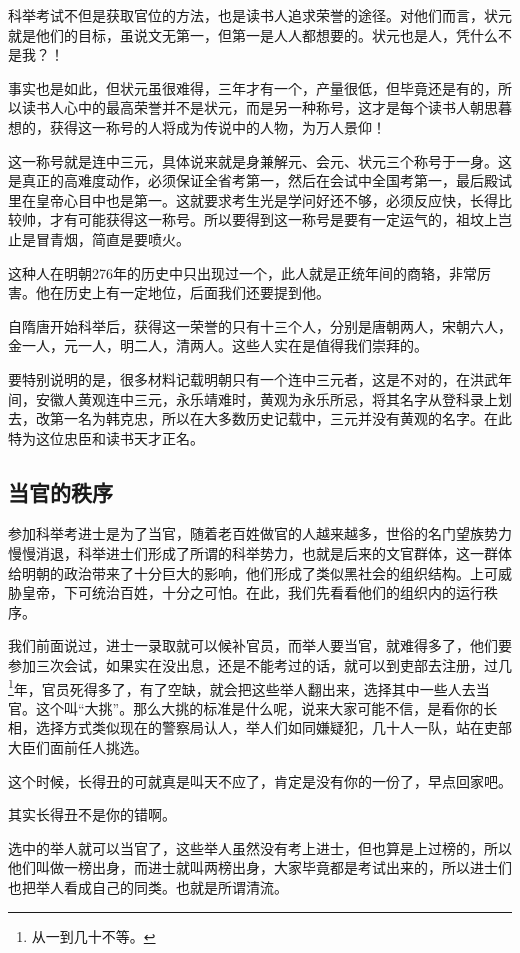 \begin{multicols}{\theparacolNo}
		科举考试不但是获取官位的方法，也是读书人追求荣誉的途径。对他们而言，状元就是他们的目标，虽说文无第一，但第一是人人都想要的。状元也是人，凭什么不是我？！

		事实也是如此，但状元虽很难得，三年才有一个，产量很低，但毕竟还是有的，所以读书人心中的最高荣誉并不是状元，而是另一种称号，这才是每个读书人朝思暮想的，获得这一称号的人将成为传说中的人物，为万人景仰！

		这一称号就是连中三元，具体说来就是身兼解元、会元、状元三个称号于一身。这是真正的高难度动作，必须保证全省考第一，然后在会试中全国考第一，最后殿试里在皇帝心目中也是第一。这就要求考生光是学问好还不够，必须反应快，长得比较帅，才有可能获得这一称号。所以要得到这一称号是要有一定运气的，祖坟上岂止是冒青烟，简直是要喷火。

		这种人在明朝276年的历史中只出现过一个，此人就是正统年间的商辂，非常厉害。他在历史上有一定地位，后面我们还要提到他。

		自隋唐开始科举后，获得这一荣誉的只有十三个人，分别是唐朝两人，宋朝六人，金一人，元一人，明二人，清两人。这些人实在是值得我们崇拜的。

		要特别说明的是，很多材料记载明朝只有一个连中三元者，这是不对的，在洪武年间，安徽人黄观连中三元，永乐靖难时，黄观为永乐所忌，将其名字从登科录上划去，改第一名为韩克忠，所以在大多数历史记载中，三元并没有黄观的名字。在此特为这位忠臣和读书天才正名。

		\subsection{当官的秩序}
		参加科举考进士是为了当官，随着老百姓做官的人越来越多，世俗的名门望族势力慢慢消退，科举进士们形成了所谓的科举势力，也就是后来的文官群体，这一群体给明朝的政治带来了十分巨大的影响，他们形成了类似黑社会的组织结构。上可威胁皇帝，下可统治百姓，十分之可怕。在此，我们先看看他们的组织内的运行秩序。

		我们前面说过，进士一录取就可以候补官员，而举人要当官，就难得多了，他们要参加三次会试，如果实在没出息，还是不能考过的话，就可以到吏部去注册，过几\footnote{从一到几十不等。}年，官员死得多了，有了空缺，就会把这些举人翻出来，选择其中一些人去当官。这个叫“大挑”。那么大挑的标准是什么呢，说来大家可能不信，是看你的长相，选择方式类似现在的警察局认人，举人们如同嫌疑犯，几十人一队，站在吏部大臣们面前任人挑选。

		这个时候，长得丑的可就真是叫天不应了，肯定是没有你的一份了，早点回家吧。

		其实长得丑不是你的错啊。

		选中的举人就可以当官了，这些举人虽然没有考上进士，但也算是上过榜的，所以他们叫做一榜出身，而进士就叫两榜出身，大家毕竟都是考试出来的，所以进士们也把举人看成自己的同类。也就是所谓清流。


\end{multicols}

